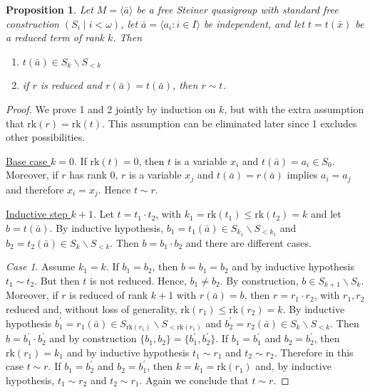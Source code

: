 \documentclass[10pt,a4paper]{article}
\newcommand{\rk}{\mathrm{rk}}
\theoremstyle{note}
\newtheorem{prop}[thm]{Proposition}
\begin{document}
	\begin{prop}\label{May19_1}
		Let $M=\langle \bar{a}\rangle$ be a free Steiner quasigroup with standard free construction $(S_i\mid i<\omega)$, let  $\bar{a}= \langle a_i : i \in I \rangle$ be  independent, and let $t= t(\bar{x})$ be a reduced term of rank $k$. Then
		\begin{enumerate}
			\item $t(\bar{a})\in S_k\smallsetminus S_{<k}$
			\item if $r$ is reduced and  $r(\bar{a})= t(\bar{a})$, then $r\sim t$.
		\end{enumerate}
	\end{prop}
	\begin{proof} We prove 1 and 2 jointly by induction on $k$, but with the extra assumption that $\rk(r)=\rk(t)$. This assumption can be eliminated  later since 1 excludes other possibilities.
		
		\underline{Base case $k=0$}.  If $\rk(t)=0$, then $t$ is a variable $x_i$ and  $t(\bar{a})= a_i\in S_0$.  Moreover, if $r$ has rank 0, $r$ is a variable $x_j$  and  $t(\bar{a})= r(\bar{a})$  implies $a_i =a_j$ and therefore  $x_i = x_j$. Hence  $t\sim r$.
		
		\underline{Inductive step $k+1$}.  Let $t= t_1\cdot t_2$, with $k_1= \rk(t_1)\leq \rk(t_2) = k$ and let  $b= t(\bar{a})$.  By inductive hypothesis, $b_1= t_1(\bar{a})\in S_{k_1}\smallsetminus S_{<k_1}$ and $b_2= t_2(\bar{a})\in S_k\smallsetminus S_{<k}$. Then $b= b_1\cdot b_2$ and there are different cases.
		
		\emph{Case 1}. Assume $k_1 = k$.  If  $b_1 = b_2$, then $b= b_1= b_2$ and by inductive hypothesis $t_1\sim t_2$. But then $t$ is not reduced. Hence, 
		$b_1\neq b_2$. By construction, $b\in S_{k+1}\smallsetminus S_k$.  Moreover, if $r$ is reduced of rank $k+1$ with $r(\bar{a})= b$, then $r= r_1\cdot r_2$, with $r_1,r_2$ reduced and, without loss of generality, $\rk(r_1)\leq \rk(r_2)= k$. By inductive hypothesis $b_1^\prime = r_1(\bar{a})\in S_{\rk(r_1)}\smallsetminus S_{<\rk(r_1)}$  and $b_2^\prime = r_2(\bar{a})\in S_k\smallsetminus S_{<k}$. Then $b= b_1^\prime\cdot b_2^\prime$ and by construction $\{b_1,b_2\}= \{b_1^\prime,b_2^\prime\}$. If $b_1= b_1^\prime$ and $b_2 = b_2^\prime$, then $\rk(r_1)= k_1$ and by inductive hypothesis $t_1\sim r_1$ and $t_2\sim r_2$. Therefore in this case $t\sim r$. If $b_1= b_2^\prime$ and $b_2= b_1^\prime$, then $k=k_1= \rk(r_1)$ and, by inductive hypothesis, $t_1\sim r_2$ and $t_2\sim r_1$. Again we conclude that $t\sim r$.
		

\end{proof}
\end{document}
